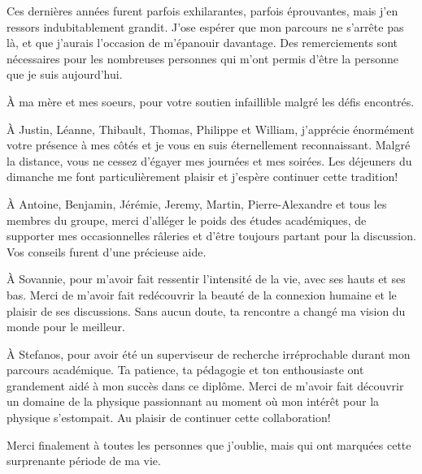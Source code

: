 \begin{comment}
\end{comment}

Ces dernières années furent parfois exhilarantes, parfois éprouvantes, mais j'en ressors indubitablement grandit. J'ose espérer que mon parcours ne s'arrête pas là, et que j'aurais l'occasion de m'épanouir davantage. Des remerciements sont nécessaires pour les nombreuses personnes qui m'ont permis d'être la personne que je suis aujourd'hui.

À ma mère et mes soeurs, pour votre soutien infaillible malgré les défis encontrés. 

À Justin, Léanne, Thibault, Thomas, Philippe et William, j'apprécie énormément votre présence à mes côtés et je vous en suis éternellement reconnaissant.  Malgré la distance, vous ne cessez d'égayer mes journées et mes soirées. Les déjeuners du dimanche me font particulièrement plaisir et j'espère continuer cette tradition!

À Antoine, Benjamin, Jérémie, Jeremy, Martin, Pierre-Alexandre et tous les membres du groupe, merci d'alléger le poids des études académiques, de supporter mes occasionnelles râleries et d'être toujours partant pour la discussion. Vos conseils furent d'une précieuse aide. 


À Sovannie, pour m'avoir fait ressentir l'intensité de la vie, avec ses hauts et ses bas. Merci de m'avoir fait redécouvrir la beauté de la connexion humaine et le plaisir de ses discussions. Sans aucun doute, ta rencontre a changé ma vision du monde pour le meilleur.

À Stefanos, pour avoir été un superviseur de recherche irréprochable durant mon parcours académique. Ta patience, ta pédagogie et ton enthousiaste ont grandement aidé à mon succès dans ce diplôme. Merci de m'avoir fait découvrir un domaine de la physique passionnant au moment où mon intérêt pour la physique s'estompait.  Au plaisir de continuer cette collaboration!

Merci finalement à toutes les personnes que j'oublie, mais qui ont marquées cette surprenante période de ma vie.

